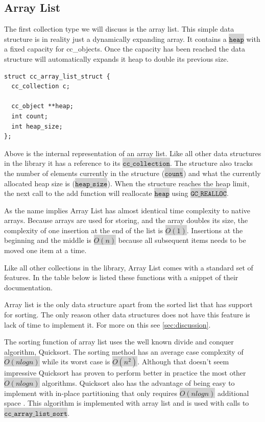 \documentclass[table]{ituthesis}
\newcommand{\highlight}[1]{\colorbox{lightGray}{$\displaystyle \texttt{#1}$}}
\begin{document}
	\subsection{Array List}\label{sec:array_list}
	
	The first collection type we will discuss is the array list. This simple data structure is in reality just a dynamically expanding array. It contains a \highlight{heap} with a fixed capacity for cc\_objects. Once the capacity has been reached the data structure will automatically expands it heap to double its previous size.

\begin{lstlisting}[label=cc_array_list-struct,caption=Internal representation of Array List]
struct cc_array_list_struct {
  cc_collection c;

  cc_object **heap;
  int count;
  int heap_size;
};
\end{lstlisting}

	Above is the internal representation of an array list. Like all other data structures in the library it has a reference to its \highlight{cc\_collection}. The structure also tracks the number of elements currently in the structure (\highlight{count}) and what the currently allocated heap size is (\highlight{heap\_size}). When the structure reaches the heap limit, the next call to the add function will reallocate \highlight{heap} using \highlight{GC\_REALLOC}.

	As the name implies Array List has almost identical time complexity to native arrays. Because arrays are used for storing, and the array doubles its size, the complexity of one insertion at the end of the list is \highlight{$O(1)$}. Insertions at the beginning and the middle is \highlight{$O(n)$} because all subsequent items needs to be moved one item at a time.

	Like all other collections in the library, Array List comes with a standard set of features. In the table below is listed these functions with a snippet of their documentation.
	
	Array list is the only data structure apart from the sorted list that has support for sorting. The only reason other data structures does not have this feature is lack of time to implement it. For more on this see \autoref{sec:discussion}.

	The sorting function of array list uses the well known divide and conquer algorithm, Quicksort. The sorting method has an average case complexity of \highlight{$O(n log n)$} while its worst case is \highlight{$O(n^2)$}. Although that doesn't seem impressive Quicksort has proven to perform better in practice the most other \highlight{$O(n log n)$} algorithms. Quicksort also has the advantage of being easy to implement with in-place partitioning that only requires \highlight{$O(n log n)$} additional space \cite[p. 145]{Algorithms2002}. This algorithm is implemented with array list and is used with calls to \highlight{cc\_array\_list\_sort}.
	
\end{document}
